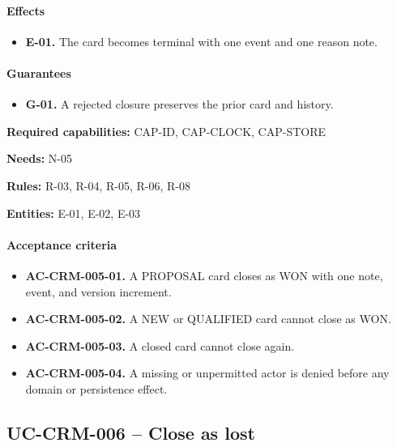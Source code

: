 \documentclass[10pt,a4paper]{article}
\begin{document}
\paragraph{Effects}

\begin{itemize}

\item \textbf{E-01.} The card becomes terminal with one event and one reason note.

\end{itemize}

\paragraph{Guarantees}

\begin{itemize}

\item \textbf{G-01.} A rejected closure preserves the prior card and history.

\end{itemize}

\textbf{Required capabilities:} CAP-ID, CAP-CLOCK, CAP-STORE

\textbf{Needs:} N-05

\textbf{Rules:} R-03, R-04, R-05, R-06, R-08

\textbf{Entities:} E-01, E-02, E-03

\paragraph{Acceptance criteria}

\begin{itemize}

\item \textbf{AC-CRM-005-01.} A PROPOSAL card closes as WON with one note, event, and version increment.

\item \textbf{AC-CRM-005-02.} A NEW or QUALIFIED card cannot close as WON.

\item \textbf{AC-CRM-005-03.} A closed card cannot close again.

\item \textbf{AC-CRM-005-04.} A missing or unpermitted actor is denied before any domain or persistence effect.

\end{itemize}

\subsection{UC-CRM-006 -- Close as lost}
\end{document}
